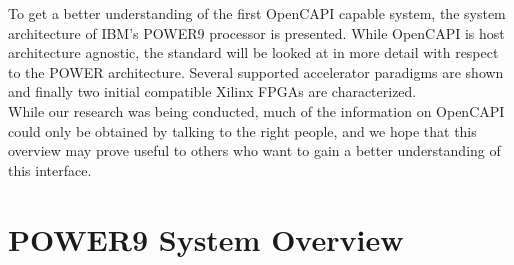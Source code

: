 
To get a better understanding of the first OpenCAPI capable system, the system architecture of IBM's POWER9 processor is presented. While OpenCAPI is host architecture agnostic, the standard will be looked at in more detail with respect to the POWER architecture. Several supported accelerator paradigms are shown and finally two initial compatible Xilinx FPGAs are characterized.\\
While our research was being conducted, much of the information on OpenCAPI could only be obtained by talking to the right people, and we hope that this overview may prove useful to others who want to gain a better understanding of this interface.



\section{POWER9 System Overview}

